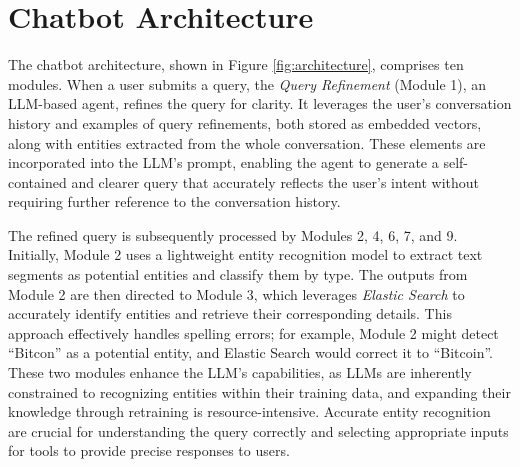 \documentclass[runningheads]{llncs}
\begin{document}
\section{Chatbot Architecture}
\label{sec:architecture}

The chatbot architecture, shown in Figure \ref{fig:architecture}, comprises ten modules. When a user submits a query, the \textit{Query Refinement} (Module 1), an LLM-based agent, refines the query for clarity. It leverages the user’s conversation history and examples of query refinements, both stored as embedded vectors, along with entities extracted from the whole conversation. These elements are incorporated into the LLM's prompt, enabling the agent to generate a self-contained and clearer query that accurately reflects the user's intent without requiring further reference to the conversation history.

The refined query is subsequently processed by Modules 2, 4, 6, 7, and 9. Initially, Module 2 uses a lightweight entity recognition model to extract text segments as potential entities and classify them by type.%
The outputs from Module 2 are then directed to Module 3, which leverages \textit{Elastic Search} to accurately identify entities and retrieve their corresponding details. This approach effectively handles spelling errors; for example, Module 2 might detect ``Bitcon'' as a potential entity, and Elastic Search would correct it to ``Bitcoin''. These two modules enhance the LLM’s capabilities, as LLMs are inherently constrained to recognizing entities within their training data, and expanding their knowledge through retraining is resource-intensive. Accurate entity recognition are crucial for understanding the query correctly and selecting appropriate inputs for tools to provide precise responses to users.


\end{document}
